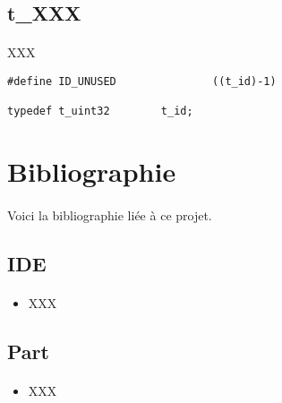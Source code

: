 \documentclass[10pt,a4wide]{article}
\begin{document}
\subsection{t\_XXX}

\paragraph{}

XXX

\begin{verbatim}
#define ID_UNUSED               ((t_id)-1)

typedef t_uint32        t_id;
\end{verbatim}

\section{Bibliographie}

\paragraph{}

Voici la bibliographie li\'ee \`a ce projet.

\subsection{IDE}

\paragraph{}

\begin{itemize}
\item XXX
\end{itemize}

\subsection{Part}

\paragraph{}

\begin{itemize}
\item XXX
\end{itemize}
\end{document}
